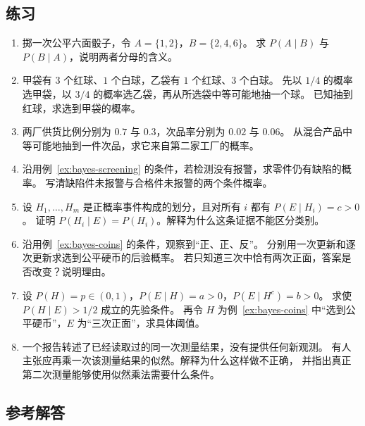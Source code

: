 \documentclass[UTF8]{ctexart}
\begin{document}
\subsection{练习}

\begin{enumerate}
  \item \label{exr:bayes-die}
  掷一次公平六面骰子，令 $A=\{1,2\}$，$B=\{2,4,6\}$。
  求 $P(A\mid B)$ 与 $P(B\mid A)$，说明两者分母的含义。

  \item \label{exr:bayes-bags}
  甲袋有 $3$ 个红球、$1$ 个白球，乙袋有 $1$ 个红球、$3$ 个白球。
  先以 $1/4$ 的概率选甲袋，以 $3/4$ 的概率选乙袋，再从所选袋中等可能地抽一个球。
  已知抽到红球，求选到甲袋的概率。

  \item \label{exr:bayes-factories}
  两厂供货比例分别为 $0.7$ 与 $0.3$，次品率分别为 $0.02$ 与 $0.06$。
  从混合产品中等可能地抽到一件次品，求它来自第二家工厂的概率。

  \item \label{exr:bayes-negative}
  沿用例~\ref{ex:bayes-screening} 的条件，若检测没有报警，求零件仍有缺陷的概率。
  写清缺陷件未报警与合格件未报警的两个条件概率。

  \item \label{exr:bayes-neutral}
  设 $H_1,\ldots,H_m$ 是正概率事件构成的划分，且对所有 $i$ 都有 $P(E\mid H_i)=c>0$。
  证明 $P(H_i\mid E)=P(H_i)$。解释为什么这条证据不能区分类别。

  \item \label{exr:bayes-sequence}
  沿用例~\ref{ex:bayes-coins} 的条件，观察到“正、正、反”。
  分别用一次更新和逐次更新求选到公平硬币的后验概率。
  若只知道三次中恰有两次正面，答案是否改变？说明理由。

  \item \label{exr:bayes-threshold}
  设 $P(H)=p\in(0,1)$，$P(E\mid H)=a>0$，$P(E\mid H^c)=b>0$。
  求使 $P(H\mid E)>1/2$ 成立的先验条件。
  再令 $H$ 为例~\ref{ex:bayes-coins} 中“选到公平硬币”，$E$ 为“三次正面”，求具体阈值。

  \item \label{exr:bayes-repeat}
  一个报告转述了已经读取过的同一次测量结果，没有提供任何新观测。
  有人主张应再乘一次该测量结果的似然。解释为什么这样做不正确，
  并指出真正第二次测量能够使用似然乘法需要什么条件。
\end{enumerate}

\subsection{参考解答}
\end{document}
